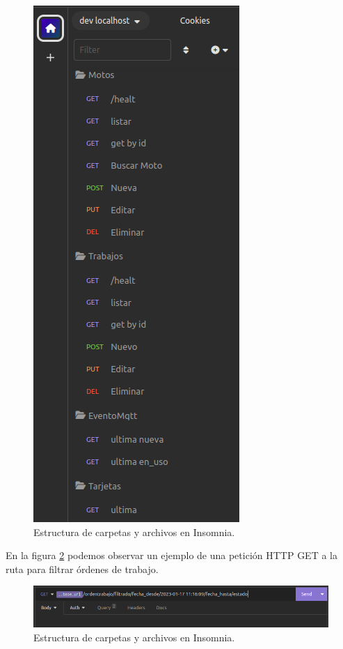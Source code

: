 \begin{figure}[H]
	\centering
	\includegraphics[scale=.50]{./Figures/insomnia-carpetas2.png}
	\caption{Estructura de carpetas y archivos en Insomnia.}
	\label{fig:insomnia-carpetas}
\end{figure}
  
En la figura \ref{fig:insomnia-request-1} podemos observar un ejemplo de una petición HTTP GET a la ruta para filtrar órdenes de trabajo.

\begin{figure}[H]
	\centering
	\includegraphics[width=\textwidth]{./Figures/insomnia-request-1.png}
	\caption{Estructura de carpetas y archivos en Insomnia.}
	\label{fig:insomnia-request-1}
\end{figure}

